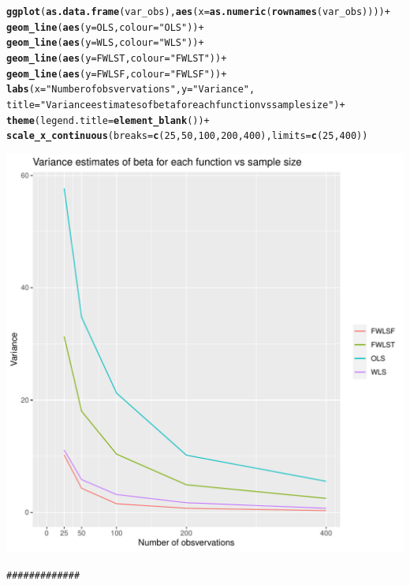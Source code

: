 \documentclass{article}\usepackage[]{graphicx}\usepackage[]{color}
\makeatletter
\def\maxwidth{ %
  \ifdim\Gin@nat@width>\linewidth
    \linewidth
  \else
    \Gin@nat@width
  \fi
}
\newcommand{\hlnum}[1]{\textcolor[rgb]{0.686,0.059,0.569}{#1}}%
\newcommand{\hlstr}[1]{\textcolor[rgb]{0.192,0.494,0.8}{#1}}%
\newcommand{\hlcom}[1]{\textcolor[rgb]{0.678,0.584,0.686}{\textit{#1}}}%
\newcommand{\hlopt}[1]{\textcolor[rgb]{0,0,0}{#1}}%
\newcommand{\hlstd}[1]{\textcolor[rgb]{0.345,0.345,0.345}{#1}}%
\newcommand{\hlkwc}[1]{\textcolor[rgb]{0.333,0.667,0.333}{#1}}%
\newcommand{\hlkwd}[1]{\textcolor[rgb]{0.737,0.353,0.396}{\textbf{#1}}}%
\newenvironment{kframe}{%
 \def\at@end@of@kframe{}%
 \ifinner\ifhmode%
  \def\at@end@of@kframe{\end{minipage}}%
  \begin{minipage}{\columnwidth}%
 \fi\fi%
 \def\FrameCommand##1{\hskip\@totalleftmargin \hskip-\fboxsep
 \colorbox{shadecolor}{##1}\hskip-\fboxsep
     \hskip-\linewidth \hskip-\@totalleftmargin \hskip\columnwidth}%
 \MakeFramed {\advance\hsize-\width
   \@totalleftmargin\z@ \linewidth\hsize
   \@setminipage}}%
 {\par\unskip\endMakeFramed%
 \at@end@of@kframe}
\newenvironment{knitrout}{}{} %
\makeatother
\begin{document}
\begin{knitrout}
\begin{kframe}
\begin{alltt}
\hlkwd{ggplot}\hlstd{(}\hlkwd{as.data.frame}\hlstd{(var_obs),}\hlkwd{aes}\hlstd{(}\hlkwc{x}\hlstd{=}\hlkwd{as.numeric}\hlstd{(}\hlkwd{rownames}\hlstd{(var_obs))))} \hlopt{+}
  \hlkwd{geom_line}\hlstd{(}\hlkwd{aes}\hlstd{(}\hlkwc{y} \hlstd{= OLS,} \hlkwc{colour} \hlstd{=} \hlstr{"OLS"}\hlstd{))} \hlopt{+}
  \hlkwd{geom_line}\hlstd{(}\hlkwd{aes}\hlstd{(}\hlkwc{y} \hlstd{= WLS,} \hlkwc{colour} \hlstd{=} \hlstr{"WLS"}\hlstd{))} \hlopt{+}
  \hlkwd{geom_line}\hlstd{(}\hlkwd{aes}\hlstd{(}\hlkwc{y} \hlstd{= FWLST,} \hlkwc{colour} \hlstd{=} \hlstr{"FWLST"}\hlstd{))} \hlopt{+}
  \hlkwd{geom_line}\hlstd{(}\hlkwd{aes}\hlstd{(}\hlkwc{y} \hlstd{= FWLSF,} \hlkwc{colour} \hlstd{=} \hlstr{"FWLSF"}\hlstd{))} \hlopt{+}
  \hlkwd{labs}\hlstd{(}\hlkwc{x}\hlstd{=}\hlstr{"Number of obsvervations"}\hlstd{,}\hlkwc{y}\hlstd{=}\hlstr{"Variance"}\hlstd{,}
       \hlkwc{title}\hlstd{=}\hlstr{"Variance estimates of beta for each function vs sample size"}\hlstd{)} \hlopt{+}
  \hlkwd{theme}\hlstd{(}\hlkwc{legend.title} \hlstd{=} \hlkwd{element_blank}\hlstd{())} \hlopt{+}
  \hlkwd{scale_x_continuous}\hlstd{(}\hlkwc{breaks}\hlstd{=}\hlkwd{c}\hlstd{(}\hlnum{25}\hlstd{,}\hlnum{50}\hlstd{,}\hlnum{100}\hlstd{,}\hlnum{200}\hlstd{,}\hlnum{400}\hlstd{),}\hlkwc{limits}\hlstd{=}\hlkwd{c}\hlstd{(}\hlnum{25}\hlstd{,} \hlnum{400}\hlstd{))}
\end{alltt}
\end{kframe}
\includegraphics[width=\maxwidth]{figure/unnamed-chunk-6-1} 
\begin{kframe}\begin{alltt}
\hlcom{#############}
\end{alltt}
\end{kframe}
\end{knitrout}
\end{document}
